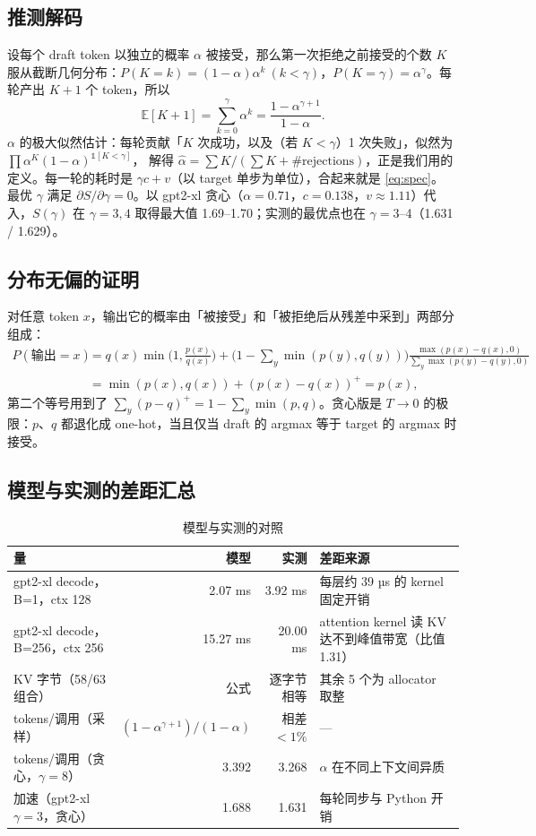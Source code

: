 \documentclass[11pt,a4paper]{ctexart}
\begin{document}
\subsection{推测解码}
设每个 draft token 以独立的概率 $\alpha$ 被接受，那么第一次拒绝之前接受的个数 $K$ 服从截断几何分布：$P(K{=}k)=(1-\alpha)\alpha^k\ (k<\gamma)$，$P(K{=}\gamma)=\alpha^\gamma$。每轮产出 $K{+}1$ 个 token，所以
\[
\mathbb{E}[K+1] = \sum_{k=0}^{\gamma}\alpha^k = \frac{1-\alpha^{\gamma+1}}{1-\alpha}.
\]
$\alpha$ 的极大似然估计：每轮贡献「$K$ 次成功，以及（若 $K<\gamma$）1 次失败」，似然为 $\prod \alpha^{K}(1-\alpha)^{\mathbb{1}[K<\gamma]}$，
解得 $\hat\alpha = \sum K / (\sum K + \#\text{rejections})$，正是我们用的定义。每一轮的耗时是 $\gamma c + v$（以 target 单步为单位），合起来就是 \cref{eq:spec}。
最优 $\gamma$ 满足 $\partial S/\partial\gamma=0$。以 gpt2-xl 贪心（$\alpha{=}0.71$，$c{=}0.138$，$v{\approx}1.11$）代入，$S(\gamma)$ 在 $\gamma{=}3,4$ 取得最大值 1.69--1.70；实测的最优点也在 $\gamma{=}3$--4（1.631 / 1.629）。

\subsection{分布无偏的证明}
对任意 token $x$，输出它的概率由「被接受」和「被拒绝后从残差中采到」两部分组成：
\[
\begin{aligned}
P(\text{输出}=x) &= q(x)\min\!\Big(1,\frac{p(x)}{q(x)}\Big) + \Big(1-\sum_y \min(p(y),q(y))\Big)\frac{\max(p(x)-q(x),0)}{\sum_y\max(p(y)-q(y),0)} \\
&= \min(p(x),q(x)) + (p(x)-q(x))^+ = p(x),
\end{aligned}
\]
第二个等号用到了 $\sum_y(p-q)^+ = 1-\sum_y\min(p,q)$。贪心版是 $T\to0$ 的极限：$p$、$q$ 都退化成 one-hot，当且仅当 draft 的 argmax 等于 target 的 argmax 时接受。

\subsection{模型与实测的差距汇总}
\begin{table}[H]
\centering\small
\caption{模型与实测的对照}\label{tab:mvm}
\begin{tabularx}{\linewidth}{l r r X}
\toprule
量 & 模型 & 实测 & 差距来源 \\
\midrule
gpt2-xl decode，B=1，ctx 128 & 2.07 ms & 3.92 ms & 每层约 39 µs 的 kernel 固定开销 \\
gpt2-xl decode，B=256，ctx 256 & 15.27 ms & 20.00 ms & attention kernel 读 KV 达不到峰值带宽（比值 1.31）\\
KV 字节（58/63 组合） & 公式 & 逐字节相等 & 其余 5 个为 allocator 取整 \\
tokens/调用（采样） & $(1-\alpha^{\gamma+1})/(1-\alpha)$ & 相差 $<1\%$ & — \\
tokens/调用（贪心，$\gamma{=}8$） & 3.392 & 3.268 & $\alpha$ 在不同上下文间异质 \\
加速（gpt2-xl $\gamma{=}3$，贪心） & 1.688 & 1.631 & 每轮同步与 Python 开销 \\
\bottomrule
\end{tabularx}
\end{table}
\end{document}
